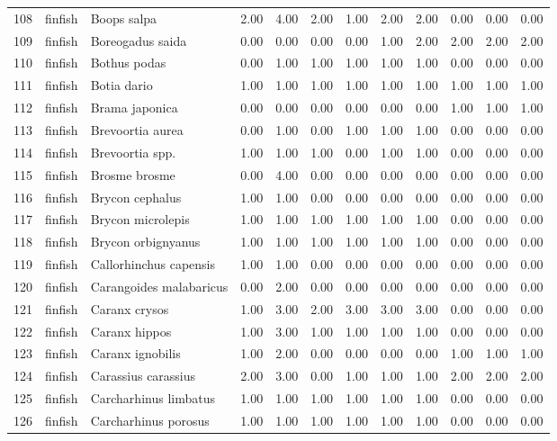 \begin{table}[ht]
\begin{tabular}{rllrrrrrrrrr}
  108 & finfish & Boops salpa & 2.00 & 4.00 & 2.00 & 1.00 & 2.00 & 2.00 & 0.00 & 0.00 & 0.00 \\ 
  109 & finfish & Boreogadus saida & 0.00 & 0.00 & 0.00 & 0.00 & 1.00 & 2.00 & 2.00 & 2.00 & 2.00 \\ 
  110 & finfish & Bothus podas & 0.00 & 1.00 & 1.00 & 1.00 & 1.00 & 1.00 & 0.00 & 0.00 & 0.00 \\ 
  111 & finfish & Botia dario & 1.00 & 1.00 & 1.00 & 1.00 & 1.00 & 1.00 & 1.00 & 1.00 & 1.00 \\ 
  112 & finfish & Brama japonica & 0.00 & 0.00 & 0.00 & 0.00 & 0.00 & 0.00 & 1.00 & 1.00 & 1.00 \\ 
  113 & finfish & Brevoortia aurea & 0.00 & 1.00 & 0.00 & 1.00 & 1.00 & 1.00 & 0.00 & 0.00 & 0.00 \\ 
  114 & finfish & Brevoortia spp. & 1.00 & 1.00 & 1.00 & 0.00 & 1.00 & 1.00 & 0.00 & 0.00 & 0.00 \\ 
  115 & finfish & Brosme brosme & 0.00 & 4.00 & 0.00 & 0.00 & 0.00 & 0.00 & 0.00 & 0.00 & 0.00 \\ 
  116 & finfish & Brycon cephalus & 1.00 & 1.00 & 0.00 & 0.00 & 0.00 & 0.00 & 0.00 & 0.00 & 0.00 \\ 
  117 & finfish & Brycon microlepis & 1.00 & 1.00 & 1.00 & 1.00 & 1.00 & 1.00 & 0.00 & 0.00 & 0.00 \\ 
  118 & finfish & Brycon orbignyanus & 1.00 & 1.00 & 1.00 & 1.00 & 1.00 & 1.00 & 0.00 & 0.00 & 0.00 \\ 
  119 & finfish & Callorhinchus capensis & 1.00 & 1.00 & 0.00 & 0.00 & 0.00 & 0.00 & 0.00 & 0.00 & 0.00 \\ 
  120 & finfish & Carangoides malabaricus & 0.00 & 2.00 & 0.00 & 0.00 & 0.00 & 0.00 & 0.00 & 0.00 & 0.00 \\ 
  121 & finfish & Caranx crysos & 1.00 & 3.00 & 2.00 & 3.00 & 3.00 & 3.00 & 0.00 & 0.00 & 0.00 \\ 
  122 & finfish & Caranx hippos & 1.00 & 3.00 & 1.00 & 1.00 & 1.00 & 1.00 & 0.00 & 0.00 & 0.00 \\ 
  123 & finfish & Caranx ignobilis & 1.00 & 2.00 & 0.00 & 0.00 & 0.00 & 0.00 & 1.00 & 1.00 & 1.00 \\ 
  124 & finfish & Carassius carassius & 2.00 & 3.00 & 0.00 & 1.00 & 1.00 & 1.00 & 2.00 & 2.00 & 2.00 \\ 
  125 & finfish & Carcharhinus limbatus & 1.00 & 1.00 & 1.00 & 1.00 & 1.00 & 1.00 & 0.00 & 0.00 & 0.00 \\ 
  126 & finfish & Carcharhinus porosus & 1.00 & 1.00 & 1.00 & 1.00 & 1.00 & 1.00 & 0.00 & 0.00 & 0.00 \\ 

\end{tabular}
\end{table}
